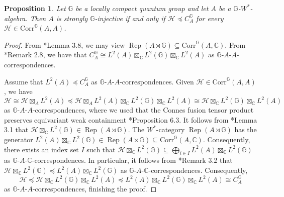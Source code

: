 \documentclass[reqno]{amsart}
\numberwithin{equation}{section}
\newtheorem{Prop}[Theorem]{Proposition}
\DeclareMathOperator{\Rep}{\mathrm{Rep}}
\newcommand{\mcH}{\mathcal{H}}
\newcommand{\C}{\mathbb{C}}
\newcommand{\G}{\mathbb{G}}
\newcommand{\Corr}{\mathrm{Corr}}
\begin{document}
\begin{Prop}\label{charstronginj}
    Let $\G$ be a locally compact quantum group and let $A$ be a $\G$-$W^*$-algebra. Then $A$ is strongly $\G$-injective if and only if $\mcH \preccurlyeq C_A^\G$ for every $\mcH \in \Corr^\G(A,A)$.
\end{Prop}
\begin{proof} 

From \cite{DR25b}*{Lemma 3.8}, we may view $\Rep(A\rtimes \G) \subseteq \Corr^\G(A,\C)$. From \cite{DCDR24}*{Remark 2.8}, we have that $C_A^\G \cong L^2(A)\boxtimes_\C L^2(\G)\boxtimes_\C L^2(A)$ as $\G$-$A$-$A$-correspondences. 

Assume that $L^2(A)\preccurlyeq C_{A}^\G$ as $\G$-$A$-$A$-correspondences. Given $\mcH \in \Corr^\G(A,A)$, we have $$\mcH \cong \mcH \boxtimes_A L^2(A) \preccurlyeq \mcH\boxtimes_A L^2(A) \boxtimes_\C L^2(\G)\boxtimes_\C L^2(A)\cong \mcH\boxtimes_\C L^2(\G) \boxtimes_\C L^2(A)$$ as $\G$-$A$-$A$-correspondences, where we used that the Connes fusion tensor product preserves equivariant weak containment \cite{DCDR24}*{Proposition 6.3}. It follows from \cite{DR25c}*{Lemma 3.1} that $\mcH \boxtimes_\C L^2(\G)\in \Rep(A\rtimes \G)$. The $W^*$-category $\Rep(A\rtimes \G)$ has the generator $L^2(A)\boxtimes_\C L^2(\G)\in \Rep(A\rtimes \G)\subseteq \Corr^\G(A,\C)$. Consequently, there exists an index set $I$ such that 
    $\mcH\boxtimes_\C L^2(\G) \subseteq \bigoplus_{i\in I} L^2(A)\boxtimes_\C L^2(\G)$
    as $\G$-$A$-$\C$-correspondences. In particular, it follows from \cite{DCDR24}*{Remark 3.2} that $\mcH \boxtimes_\C L^2(\G)\preccurlyeq L^2(A)\boxtimes_\C L^2(\G)$ as $\G$-$A$-$\C$-correspondences. Consequently,
    $$\mcH \preccurlyeq \mcH \boxtimes_\C L^2(\G)\boxtimes_\C L^2(A)\preccurlyeq L^2(A)\boxtimes_\C L^2(\G)\boxtimes_\C L^2(A)\cong C_A^\G$$
    as $\G$-$A$-$A$-correspondences, finishing the proof.
\end{proof}
\end{document}
